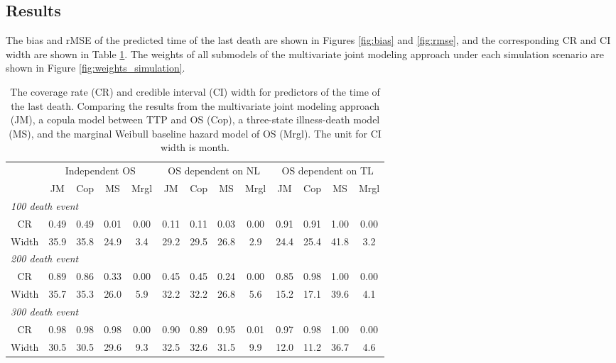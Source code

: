 \subsection{Results}

The bias and \ac{rMSE} of the predicted time of the last death are shown in Figures \ref{fig:bias} and \ref{fig:rmse}, and the corresponding \ac{CR} and \ac{CI} width are shown in Table \ref{tab:sim_result}. The weights of all submodels of the multivariate joint modeling approach under each simulation scenario are shown in Figure \ref{fig:weights_simulation}.

\begin{table}
\caption{The coverage rate (CR) and credible interval (CI) width for predictors of the time of the last death. Comparing the results from the multivariate joint modeling approach (JM), a copula model between TTP and OS (Cop), a three-state illness-death model (MS), and the marginal Weibull baseline hazard model of OS (Mrgl). The unit for CI width is month.  \label{tab:sim_result}}
\begin{center}
\begin{tabular}{ccccccccccccc}
& \multicolumn{4}{c}{Independent OS} & \multicolumn{4}{c}{OS dependent on NL} & \multicolumn{4}{c}{OS dependent on TL} \\ 
& JM & Cop & MS & Mrgl & JM & Cop & MS & Mrgl & JM & Cop & MS & Mrgl \\ \hline
\multicolumn{10}{l}{\textit{100 death event}}\\
CR & 0.49 & 0.49 & 0.01 & 0.00 & 0.11 & 0.11 & 0.03 & 0.00 &  0.91 & 0.91 & 1.00 & 0.00 \\ 
Width & 35.9 & 35.8 & 24.9 & 3.4  & 29.2 & 29.5 & 26.8 & 2.9  &  24.4 & 25.4 & 41.8 & 3.2 \\ \hline
\multicolumn{10}{l}{\textit{200 death event}}\\
CR & 0.89 & 0.86 & 0.33 & 0.00 & 0.45 & 0.45 & 0.24 & 0.00 & 0.85 & 0.98 & 1.00 & 0.00 \\ 
Width & 35.7 & 35.3 & 26.0 & 5.9 & 32.2 & 32.2 & 26.8 & 5.6 & 15.2 & 17.1 & 39.6 & 4.1  \\ \hline
\multicolumn{10}{l}{\textit{300 death event}}\\
CR & 0.98 & 0.98 & 0.98 & 0.00 & 0.90 & 0.89 &  0.95 & 0.01  & 0.97 & 0.98 & 1.00 & 0.00 \\ 
Width & 30.5 & 30.5 & 29.6 & 9.3 & 32.5 & 32.6 & 31.5 & 9.9 & 12.0 & 11.2 & 36.7 & 4.6 \\ 
\hline
\end{tabular}
\end{center}
\end{table}


